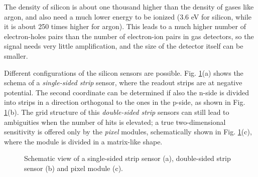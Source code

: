 The density of silicon is about one thousand higher than the density of gases like argon, and also need a much lower energy to be ionized (3.6 eV for silicon, while it is about 250 times higher for argon). This leads to a much higher number of electron-holes pairs than the number of electron-ion pairs in gas detectors, so the signal needs very little amplification, and the size of the detector itself can be smaller. 

Different configurations of the silicon sensors are possible. Fig. \ref{fig:det:shower_elec}(a) shows the schema of a \textit{single-sided strip} sensor, where the readout strips are at negative potential. The second coordinate can be determined if also the n-side is divided into strips in a direction orthogonal to the ones in the p-side, as shown in Fig. \ref{fig:det:shower_elec}(b). The grid structure of this \textit{double-sided strip} sensors can still lead to ambiguities when the number of hits is elevated; a true two-dimensional sensitivity is offered only by the \textit{pixel} modules, schematically shown in Fig. \ref{fig:det:shower_elec}(c), where the module is divided in a matrix-like shape.

\begin{figure}[ht]
\centering
{}
\caption{Schematic view of a single-sided strip sensor (a), double-sided strip sensor (b) and pixel module (c). }
\label{fig:det:shower_elec}
\end{figure}



